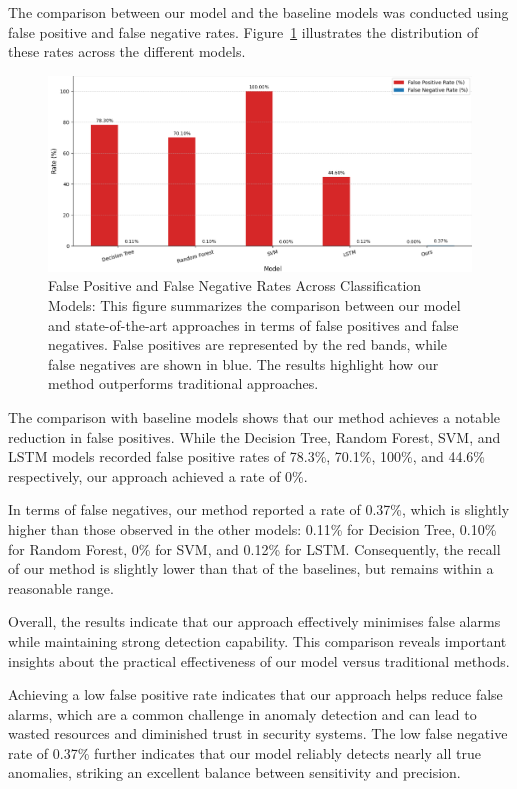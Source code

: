 \documentclass[pdflatex,sn-mathphys-num]{sn-jnl}
\theoremstyle{thmstyleone}
\theoremstyle{thmstyletwo}
\theoremstyle{thmstylethree}
\begin{document}
\noindent The comparison between our model and the baseline models was conducted using false positive and false negative rates. Figure~\ref{fig:fp_fn_comparison} illustrates the distribution of these rates across the different models.
\begin{figure}[H]
    \centering
    \includegraphics[width=1.05\linewidth]{compa3.png}
    \caption{False Positive and False Negative Rates Across Classification Models:
This figure summarizes the comparison between our model and state-of-the-art approaches in terms of false positives and false negatives. False positives are represented by the red bands, while false negatives are shown in blue. The results highlight how our method outperforms traditional approaches.}
    \label{fig:fp_fn_comparison}
\end{figure}
\noindent The comparison with baseline models shows that our method achieves a notable reduction in false positives. While the Decision Tree, Random Forest, SVM, and LSTM models recorded false positive rates of 78.3\%, 70.1\%, 100\%, and 44.6\% respectively, our approach achieved a rate of 0\%. 

In terms of false negatives, our method reported a rate of 0.37\%, which is slightly higher than those observed in the other models: 0.11\% for Decision Tree, 0.10\% for Random Forest, 0\% for SVM, and 0.12\% for LSTM. Consequently, the recall of our method is slightly lower than that of the baselines, but remains within a reasonable range.


Overall, the results indicate that our approach effectively minimises false alarms while maintaining strong detection capability. This comparison  reveals important insights about the practical effectiveness of our model versus traditional methods. 

Achieving a low false positive rate indicates that our approach helps reduce false alarms, which are a common challenge in anomaly detection and can lead to wasted resources and diminished trust in security systems. The low false negative rate of 0.37\% further indicates that our model reliably detects nearly all true anomalies, striking an excellent balance between sensitivity and precision.
\end{document}
